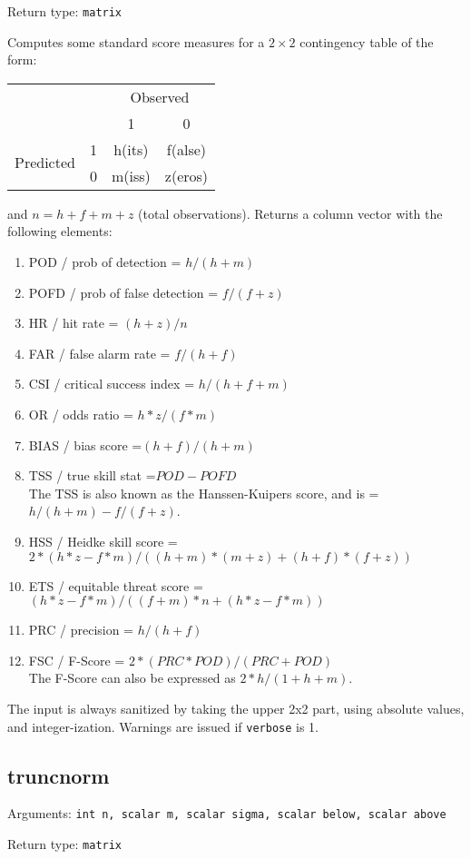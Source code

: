 \documentclass[11pt,english]{article}
\providecommand{\tabularnewline}{\\}
\begin{document}
\noindent Return type: \texttt{matrix}

Computes some standard score measures for a $2\times 2$ contingency
table of the form:

\begin{tabular}{cccc}
\toprule 
 &  & \multicolumn{2}{c}{Observed}\tabularnewline
 &  & 1 & 0\tabularnewline
\midrule
\multirow{2}{*}{Predicted} & 1 & h(its) & f(alse)\tabularnewline
 & 0 & m(iss) & z(eros)\tabularnewline
\bottomrule
\end{tabular}

and $n=h+f+m+z$ (total observations). Returns a column vector with
the following elements:
\begin{enumerate}
\item POD / prob of detection = $h/(h+m)$
\item POFD / prob of false detection = $f/(f+z)$ 
\item HR / hit rate = $(h+z)/n$ 
\item FAR / false alarm rate = $f/(h+f)$ 
\item CSI / critical success index = $h/(h+f+m)$
\item OR / odds ratio = $h*z/(f*m)$
\item BIAS / bias score =$(h+f)/(h+m)$
\item TSS / true skill stat =$POD-POFD$\\
The TSS is also known as the Hanssen-Kuipers score, and is = $h/(h+m)-f/(f+z)$.
\item HSS / Heidke skill score = $2*(h*z-f*m)/((h+m)*(m+z)+(h+f)*(f+z))$
\item ETS / equitable threat score = $(h*z-f*m)/((f+m)*n+(h*z-f*m))$
\item PRC / precision = $h/(h+f)$
\item FSC / F-Score = $2*(PRC*POD)/(PRC+POD)$\\
The F-Score can also be expressed as $2*h/(1+h+m)$.
\end{enumerate}
The input is always sanitized by taking the upper 2x2 part, using
absolute values, and integer-ization. Warnings are issued if \texttt{verbose}
is 1. 


\subsection{truncnorm}

Arguments: \texttt{int n, scalar m, scalar sigma, scalar below, scalar
above}

\noindent Return type: \texttt{matrix}
\end{document}
